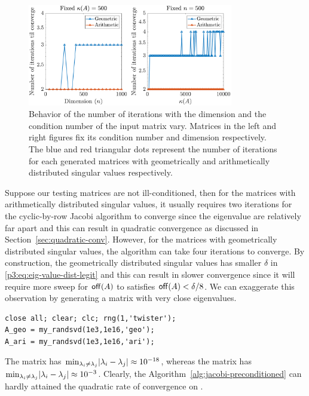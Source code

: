 \begin{figure}[ht]
\centering
\includegraphics[width=0.8\textwidth]{figs/typical-sweep.pdf}
\caption[Behavior of the number of iterations with the dimension and the condition number of the input matrix vary.]{Behavior of the number of iterations with the dimension and the condition number of the input matrix vary. Matrices in the left and right figures fix its condition number and dimension respectively. The blue and red triangular dots represent the number of iterations for each generated matrices with geometrically and arithmetically distributed singular values respectively.}
\label{fig:typical-sweep}
\end{figure}

Suppose our testing matrices are not ill-conditioned, then for the matrices with arithmetically distributed singular values, it usually requires two iterations for the cyclic-by-row Jacobi algorithm to converge since the eigenvalue are relatively far apart and this can result in quadratic convergence as discussed in Section~\ref{sec:quadratic-conv}. However, for the matrices with geometrically distributed singular values, the algorithm can take four iterations to converge. By construction, the geometrically distributed singular values has smaller $\delta$ in \eqref{p3:eq:eig-value-dist-legit} and this can result in slower convergence since it will require more sweep for $\mathsf{off}(A)$ to satisfies $\mathsf{off}(A) < \delta/8$. We can exaggerate this observation by generating a matrix with very close eigenvalues. 
\begin{lstlisting}
close all; clear; clc; rng(1,'twister');
A_geo = my_randsvd(1e3,1e16,'geo');
A_ari = my_randsvd(1e3,1e16,'ari');
\end{lstlisting}
The matrix  has $\min_{\lambda_i \neq \lambda_j}\lvert\lambda_i - \lambda_j\rvert \approx 10^{-18}$, whereas the matrix  has $\min_{\lambda_i \neq \lambda_j}\lvert\lambda_i - \lambda_j\rvert \approx 10^{-3}$. Clearly, the Algorithm~\ref{alg:jacobi-preconditioned} can hardly attained the quadratic rate of convergence on .

